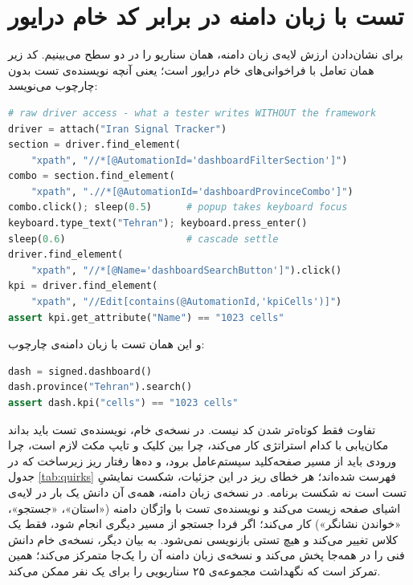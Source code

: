 \section{تست با زبان دامنه در برابر کد خام درایور}
برای نشان‌دادن ارزش لایه‌ی زبان دامنه، همان سناریو را در دو سطح می‌بینیم. کد زیر همان تعامل با فراخوانی‌های خام درایور است؛ یعنی آنچه نویسنده‌ی تست بدون چارچوب می‌نویسد:

\begin{latin}
\begin{lstlisting}[language=Python]
# raw driver access - what a tester writes WITHOUT the framework
driver = attach("Iran Signal Tracker")
section = driver.find_element(
    "xpath", "//*[@AutomationId='dashboardFilterSection']")
combo = section.find_element(
    "xpath", ".//*[@AutomationId='dashboardProvinceCombo']")
combo.click(); sleep(0.5)      # popup takes keyboard focus
keyboard.type_text("Tehran"); keyboard.press_enter()
sleep(0.6)                     # cascade settle
driver.find_element(
    "xpath", "//*[@Name='dashboardSearchButton']").click()
kpi = driver.find_element(
    "xpath", "//Edit[contains(@AutomationId,'kpiCells')]")
assert kpi.get_attribute("Name") == "1023 cells"
\end{lstlisting}
\end{latin}

و این همان تست با زبان دامنه‌ی چارچوب:

\begin{latin}
\begin{lstlisting}[language=Python]
dash = signed.dashboard()
dash.province("Tehran").search()
assert dash.kpi("cells") == "1023 cells"
\end{lstlisting}
\end{latin}

تفاوت فقط کوتاه‌تر شدن کد نیست. در نسخه‌ی خام، نویسنده‌ی تست باید بداند مکان‌یابی با کدام استراتژی کار می‌کند، چرا بین کلیک و تایپ مکث لازم است، چرا ورودی باید از مسیر صفحه‌کلید سیستم‌عامل برود، و ده‌ها رفتار ریز زیرساخت که در جدول
\autoref{tab:quirks}
فهرست شده‌اند؛ هر خطای ریز در این جزئیات، شکست نمایشیِ تست است نه شکست برنامه. در نسخه‌ی زبان دامنه، همه‌ی آن دانش یک بار در لایه‌ی اشیای صفحه زیست می‌کند و نویسنده‌ی تست با واژگان دامنه («استان»، «جستجو»، «خواندن نشانگر») کار می‌کند؛ اگر فردا جستجو از مسیر دیگری انجام شود، فقط یک کلاس تغییر می‌کند و هیچ تستی بازنویسی نمی‌شود. به بیان دیگر، نسخه‌ی خام دانش فنی را در همه‌جا پخش می‌کند و نسخه‌ی زبان دامنه آن را یک‌جا متمرکز می‌کند؛ همین تمرکز است که نگهداشت مجموعه‌ی ۲۵ سناریویی را برای یک نفر ممکن می‌کند.

